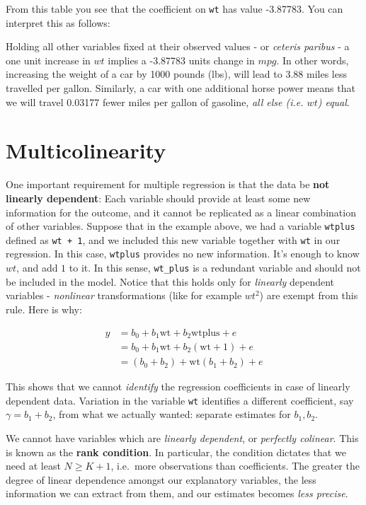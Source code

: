 \documentclass[]{book}
\newenvironment{note}{\begin{tcolorbox}[colback=blue!5!white,colframe=blue!75!black]}{\end{tcolorbox}}
\newenvironment{warning}{\begin{tcolorbox}[colback=orange!5!white,colframe=orange]}{\end{tcolorbox}}
\begin{document}
From this table you see that the coefficient on \texttt{wt} has value
-3.87783. You can interpret this as follows:

\begin{warning}
Holding all other variables fixed at their observed values - or
\emph{ceteris paribus} - a one unit increase in \(wt\) implies a
-3.87783 units change in \(mpg\). In other words, increasing the weight
of a car by 1000 pounds (lbs), will lead to 3.88 miles less travelled
per gallon. Similarly, a car with one additional horse power means that
we will travel 0.03177 fewer miles per gallon of gasoline, \emph{all
else (i.e. \(wt\)) equal}.
\end{warning}

\section{Multicolinearity}\label{multicol}

One important requirement for multiple regression is that the data be
\textbf{not linearly dependent}: Each variable should provide at least
some new information for the outcome, and it cannot be replicated as a
linear combination of other variables. Suppose that in the example
above, we had a variable \texttt{wtplus} defined as \texttt{wt\ +\ 1},
and we included this new variable together with \texttt{wt} in our
regression. In this case, \texttt{wtplus} provides no new information.
It's enough to know \(wt\), and add \(1\) to it. In this sense,
\texttt{wt\_plus} is a redundant variable and should not be included in
the model. Notice that this holds only for \emph{linearly} dependent
variables - \emph{nonlinear} transformations (like for example \(wt^2\))
are exempt from this rule. Here is why:

\begin{align}
y &= b_0 + b_1 \text{wt} + b_2 \text{wtplus} + e \\
  &= b_0 + b_1 \text{wt} + b_2 (\text{wt} + 1) + e \\
  &= (b_0 + b_2) + \text{wt} (b_1 + b_2) + e
\end{align}

This shows that we cannot \emph{identify} the regression coefficients in
case of linearly dependent data. Variation in the variable \texttt{wt}
identifies a different coefficient, say \(\gamma = b_1 + b_2\), from
what we actually wanted: separate estimates for \(b_1,b_2\).

\begin{note}
We cannot have variables which are \emph{linearly dependent}, or
\emph{perfectly colinear}. This is known as the \textbf{rank condition}.
In particular, the condition dictates that we need at least
\(N \geq K+1\), i.e.~more observations than coefficients. The greater
the degree of linear dependence amongst our explanatory variables, the
less information we can extract from them, and our estimates becomes
\emph{less precise}.
\end{note}
\end{document}
